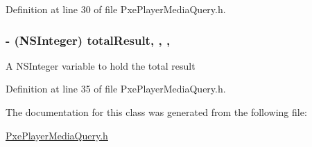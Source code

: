 Definition at line 30 of file Pxe\-Player\-Media\-Query.\-h.

\hypertarget{interface_pxe_player_media_query_a43c4c967b68b9b3fd6dec716b53fa2bb}{
\subsubsection[{total\-Result}]{\setlength{\rightskip}{0pt plus 5cm}-\/ (N\-S\-Integer) total\-Result\hspace{0.3cm}{\ttfamily [read]}, {\ttfamily [write]}, {\ttfamily [nonatomic]}, {\ttfamily [assign]}}}\label{interface_pxe_player_media_query_a43c4c967b68b9b3fd6dec716b53fa2bb}
A N\-S\-Integer variable to hold the total result 

Definition at line 35 of file Pxe\-Player\-Media\-Query.\-h.



The documentation for this class was generated from the following file\-:\begin{DoxyCompactItemize}
\item 
\hyperlink{_pxe_player_media_query_8h}{Pxe\-Player\-Media\-Query.\-h}\end{DoxyCompactItemize}
